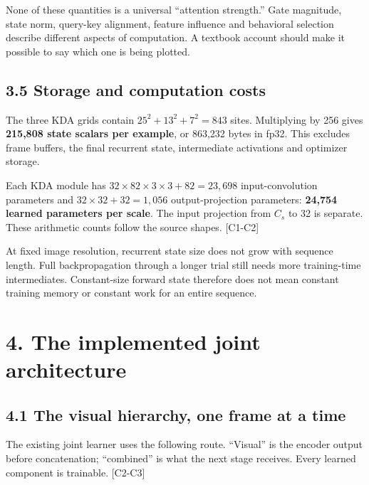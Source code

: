 \documentclass[
  11pt,
]{article}
\let\oldsubsection\subsection
\renewcommand{\subsection}{\Needspace{6\baselineskip}\oldsubsection}
\begin{document}
None of these quantities is a universal ``attention strength.'' Gate
magnitude, state norm, query-key alignment, feature influence and
behavioral selection describe different aspects of computation. A
textbook account should make it possible to say which one is being
plotted.

\subsection{3.5 Storage and computation
costs}\label{storage-and-computation-costs}

The three KDA grids contain \(25^2+13^2+7^2=843\) sites. Multiplying by
256 gives \textbf{215,808 state scalars per example}, or 863,232 bytes
in fp32. This excludes frame buffers, the final recurrent state,
intermediate activations and optimizer storage.

Each KDA module has \(32\times82\times3\times3+82=23,698\)
input-convolution parameters and \(32\times32+32=1,056\)
output-projection parameters: \textbf{24,754 learned parameters per
scale}. The input projection from \(C_s\) to 32 is separate. These
arithmetic counts follow the source shapes. {[}C1-C2{]}

At fixed image resolution, recurrent state size does not grow with
sequence length. Full backpropagation through a longer trial still needs
more training-time intermediates. Constant-size forward state therefore
does not mean constant training memory or constant work for an entire
sequence.

\newpage

\section{4. The implemented joint
architecture}\label{the-implemented-joint-architecture}

\subsection{4.1 The visual hierarchy, one frame at a
time}\label{the-visual-hierarchy-one-frame-at-a-time}

The existing joint learner uses the following route. ``Visual'' is the
encoder output before concatenation; ``combined'' is what the next stage
receives. Every learned component is trainable. {[}C2-C3{]}
\end{document}
